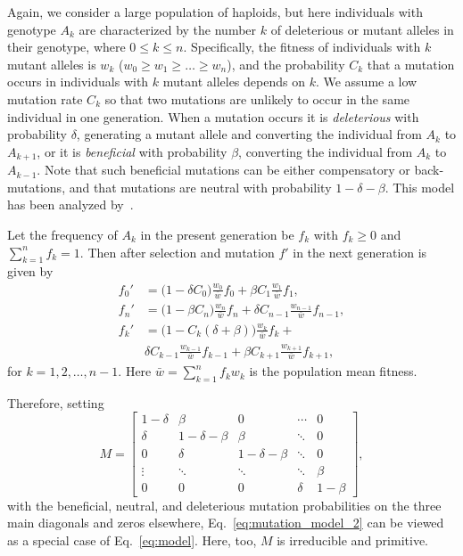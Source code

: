 \documentclass[9pt, a4paper, twocolumn]{extarticle}
\begin{document}
Again, we consider a large population of haploids, but here individuals with genotype $A_k$ are characterized by the number $k$ of deleterious or mutant alleles in their genotype, where $0 \le k \le n$.
Specifically, the fitness of individuals with $k$ mutant alleles is $w_k$ ($w_0 \ge w_1 \ge \ldots \ge w_n$),
and the probability $C_k$ that a mutation occurs in individuals with $k$ mutant alleles depends on $k$.
We assume a low mutation rate $C_k$ so that two mutations are unlikely to occur in the same individual in one generation.
When a mutation occurs it is \emph{deleterious} with probability $\delta$, generating a mutant allele and converting the individual from $A_k$ to $A_{k+1}$,
or it is \emph{beneficial} with probability $\beta$, converting the individual from $A_k$ to $A_{k-1}$.
Note that such beneficial mutations can be either compensatory or back-mutations, and that mutations are neutral with probability $1-\delta-\beta$.
This model has been analyzed by~\citet{Ram2012}.

Let the frequency of $A_k$ in the present generation be $f_k$ with $f_k \ge 0$ and $\sum_{k=1}^{n}{f_k}=1$.
Then after selection and mutation $f'$ in the next generation is given by
\begin{equation}
\begin{aligned}
f_0' &= \big(1 - \delta C_0\big) \frac{w_0}{\bar{w}} f_0 + \beta C_{1} \frac{w_{1}}{\bar{w}} f_{1}, \\
f_n' &= \big(1 - \beta C_n\big) \frac{w_n}{\bar{w}} f_n + \delta C_{n-1} \frac{w_{n-1}}{\bar{w}} f_{n-1}, \\
f_k' &= \big(1 - C_k(\delta+\beta)\big) \frac{w_k}{\bar{w}} f_k + \\
	 & \delta C_{k-1} \frac{w_{k-1}}{\bar{w}} f_{k-1} + 
	 \beta C_{k+1} \frac{w_{k+1}}{\bar{w}} f_{k+1},
\end{aligned}
\label{eq:mutation_model_2}
\end{equation}
for $k=1,2,\ldots, n-1$.
Here $\bar{w}=\sum_{k=1}^{n}{f_k w_k}$ is the population mean fitness.

Therefore, setting 
\begin{equation}
{M} = \begin{bmatrix}
1-\delta & \beta & 0 &  \cdots & 0\\
\delta & 1-\delta-\beta & \beta &  \ddots & 0\\
0 & \delta & 1-\delta-\beta & \ddots & 0 \\
\vdots & \ddots & \ddots & \ddots & \beta \\
0 & 0 & 0 & \delta & 1-\beta
\end{bmatrix},
\end{equation}
with the beneficial, neutral, and deleterious mutation probabilities on the three main diagonals and zeros elsewhere, 
Eq.~\ref{eq:mutation_model_2} can be viewed as a special case of Eq.~\ref{eq:model}.
Here, too, ${M}$ is irreducible and primitive.
\end{document}
